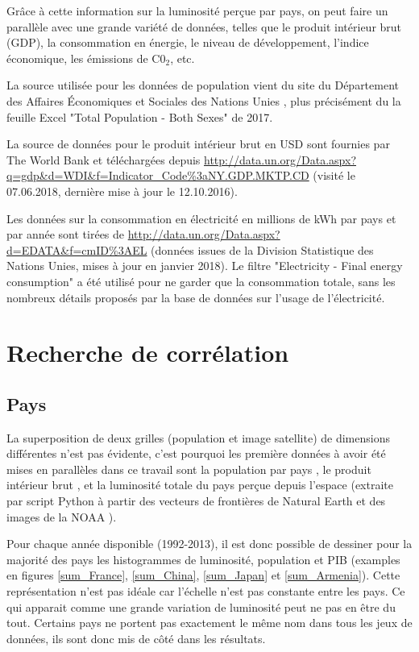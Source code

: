 \documentclass[a4paper, 11pt]{report}
\begin{document}
Grâce à cette information sur la luminosité perçue par pays, on peut faire un parallèle avec une grande variété de données, telles que le produit intérieur brut (GDP), la consommation en énergie, le niveau de développement, l'indice économique, les émissions de C0$_2$, etc.

La source utilisée pour les données de population vient du site du Département des Affaires Économiques et Sociales des Nations Unies \cite{un-wpp}, plus précisément du la feuille Excel "Total Population - Both Sexes" de 2017.

La source de données pour le produit intérieur brut en USD sont fournies par The World Bank \cite{theworldbank} et téléchargées depuis \url{http://data.un.org/Data.aspx?q=gdp&d=WDI&f=Indicator_Code%3aNY.GDP.MKTP.CD} (visité le 07.06.2018, dernière mise à jour le 12.10.2016).

Les données sur la consommation en électricité en millions de kWh par pays et par année sont tirées de \url{http://data.un.org/Data.aspx?d=EDATA&f=cmID%3AEL} (données issues de la Division Statistique des Nations Unies, mises à jour en janvier 2018). Le filtre "Electricity - Final energy consumption" a été utilisé pour ne garder que la consommation totale, sans les nombreux détails proposés par la base de données sur l'usage de l'électricité.

\section{Recherche de corrélation}
\subsection{Pays}
La superposition de deux grilles (population et image satellite) de dimensions différentes n'est pas évidente, c'est pourquoi les première données à avoir été mises en parallèles dans ce travail sont la population par pays \cite{un-wpp}, le produit intérieur brut \cite{theworldbank}, et la luminosité totale du pays perçue depuis l'espace (extraite par script Python à partir des vecteurs de frontières de Natural Earth \cite{naturalearthdata} et des images de la NOAA \cite{noaa}).

Pour chaque année disponible (1992-2013), il est donc possible de dessiner pour la majorité des pays les histogrammes de luminosité, population et PIB (examples en figures \ref{sum_France}, \ref{sum_China}, \ref{sum_Japan} et \ref{sum_Armenia}). Cette représentation n'est pas idéale car l'échelle n'est pas constante entre les pays. Ce qui apparait comme une grande variation de luminosité peut ne pas en être du tout. Certains pays ne portent pas exactement le même nom dans tous les jeux de données, ils sont donc mis de côté dans les résultats.
\end{document}
